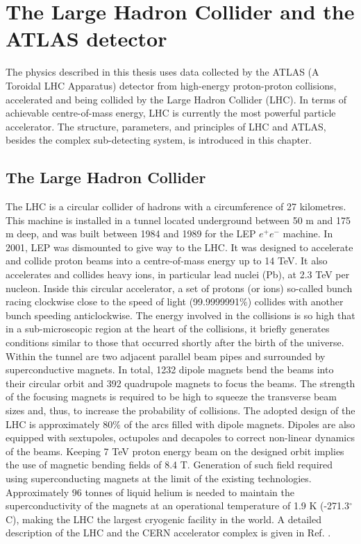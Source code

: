 \newpage
\chapter{The Large Hadron Collider and the ATLAS detector}
\label{LHC&ATLAS}

The physics described in this thesis uses data collected by the ATLAS (A Toroidal LHC Apparatus) detector from high-energy proton-proton collisions, accelerated and being collided by the Large Hadron Collider (LHC). In terms of achievable centre-of-mass energy, LHC is currently the most powerful particle accelerator. The structure, parameters, and principles of LHC and ATLAS, besides the complex sub-detecting system, is introduced in this chapter.

\section{The Large Hadron Collider}
\label{chap2:LHC}
The LHC is a circular collider of hadrons with a circumference of 27 kilometres. This machine is installed in a tunnel located underground between 50 m and 175 m deep, and was built between 1984 and 1989 for the LEP $e^+e^-$ machine. In 2001, LEP was dismounted to give way to the LHC. It was designed to accelerate and collide proton beams into a centre-of-mass energy up to 14 TeV. It also accelerates and collides heavy ions, in particular lead nuclei (Pb), at 2.3 TeV per nucleon. Inside this circular accelerator, a set of protons (or ions) so-called bunch racing clockwise close to the speed of light (99.9999991\%) collides with another bunch speeding anticlockwise. The energy involved in the collisions is so high that in a sub-microscopic region at the heart of the collisions, it briefly generates conditions similar to those that occurred shortly after the birth of the universe. \\ 
Within the tunnel are two adjacent parallel beam pipes and surrounded by superconductive magnets. In total, 1232 dipole magnets bend the beams into their circular orbit and 392 quadrupole magnets to focus the beams. The strength of the focusing magnets is required to be high to squeeze the transverse beam sizes and, thus, to increase the probability of collisions. The adopted design of the LHC is approximately 80\% of the arcs filled with dipole magnets. Dipoles are also equipped with sextupoles, octupoles and decapoles to correct non-linear dynamics of the beams.  Keeping 7 TeV proton energy beam on the designed orbit implies the use of magnetic bending fields of 8.4 T. Generation of such field required using superconducting magnets at the limit of the existing technologies. Approximately 96 tonnes of liquid helium is needed to maintain the superconductivity of the magnets at an operational temperature of 1.9 K (-271.3$^{\circ}$C), making the LHC the largest cryogenic facility in the world.  A detailed description of the LHC and the CERN accelerator complex is given in Ref. \cite{LHCTDR}.

